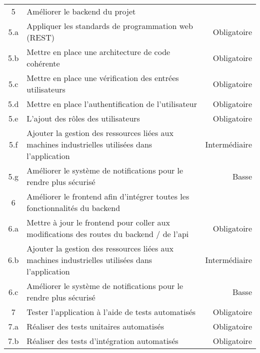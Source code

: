 \documentclass[
    iai, %
    il, %
]{heig-tb}
\begin{document}
\begin{table}[h]
\begin{center}
\begin{tabular}{c|l|r}
            5   & Améliorer le backend du projet                                                                                         &               \\
            5.a & Appliquer les standards de programmation web (REST)                                                                    & Obligatoire   \\
            5.b & Mettre en place une architecture de code cohérente                                                                     & Obligatoire   \\
            5.c & Mettre en place une vérification des entrées utilisateurs                                                              & Obligatoire   \\
            5.d & Mettre en place l’authentification de l’utilisateur                                                                    & Obligatoire   \\
            5.e & L’ajout des rôles des utilisateurs                                                                                     & Obligatoire   \\
            5.f & Ajouter la gestion des ressources liées aux machines industrielles utilisées dans l’application                        & Intermédiaire \\
            5.g & Améliorer le système de notifications pour le rendre plus sécurisé                                                     & Basse         \\
            6   & Améliorer le frontend afin d’intégrer toutes les fonctionnalités du backend                                            &               \\
            6.a & Mettre à jour le frontend pour coller aux modifications des routes du backend / de l'api                               & Obligatoire   \\
            6.b & Ajouter la gestion des ressources liées aux machines industrielles utilisées dans l’application                        & Intermédiaire \\
            6.c & Améliorer le système de notifications pour le rendre plus sécurisé                                                     & Basse         \\
            7   & Tester l’application à l’aide de tests automatisés                                                                     & Obligatoire   \\
            7.a & Réaliser des tests unitaires automatisés                                                                               & Obligatoire   \\
            7.b & Réaliser des tests d’intégration automatisés                                                                           & Obligatoire   \\
        \end{tabular}
    \end{center}
\end{table}
\end{document}

